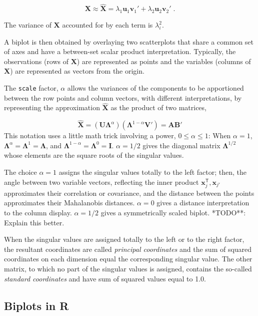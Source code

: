 \documentclass[
  letterpaper,
  10pt,
  krantz2]{krantz}
\begin{document}
{\[
\mathbf{X} \approx \widehat{\mathbf{X}} = \lambda_1 \mathbf{u}_1 \mathbf{v}_1' + \lambda_2 \mathbf{u}_2 \mathbf{v}_2' \; .
\]

The variance of \(\mathbf{X}\) accounted for by each term is
\(\lambda_i^2\).

A biplot is then obtained by overlaying two scatterplots that share a
common set of axes and have a between-set scalar product interpretation.
Typically, the observations (rows of \(\mathbf{X}\)) are represented as
points and the variables (columns of \(\mathbf{X}\)) are represented as
vectors from the origin.

The \texttt{scale} factor, \(\alpha\) allows the variances of the
components to be apportioned between the row points and column vectors,
with different interpretations, by representing the approximation
\(\widehat{\mathbf{X}}\) as the product of two matrices,

\[
\widehat{\mathbf{X}} = (\mathbf{U} \mathbf{\Lambda}^\alpha) (\mathbf{\Lambda}^{1-\alpha} \mathbf{V}') = \mathbf{A} \mathbf{B}'
\] This notation uses a little math trick involving a power,
\(0 \le \alpha \le 1\): When \(\alpha = 1\),
\(\mathbf{\Lambda}^\alpha = \mathbf{\Lambda}^1  =\mathbf{\Lambda}\), and
\(\mathbf{\Lambda}^{1-\alpha} = \mathbf{\Lambda}^0  =\mathbf{I}\).
\(\alpha = 1/2\) gives the diagonal matrix \(\mathbf{\Lambda}^{1/2}\)
whose elements are the square roots of the singular values.

The choice \(\alpha = 1\) assigns the singular values totally to the
left factor; then, the angle between two variable vectors, reflecting
the inner product \(\mathbf{x}_j^\textsf{T}, \mathbf{x}_{j'}\)
approximates their correlation or covariance, and the distance between
the points approximates their Mahalanobis distances. \(\alpha = 0\)
gives a distance interpretation to the column display. \(\alpha = 1/2\)
gives a symmetrically scaled biplot. *TODO**: Explain this better.

When the singular values are assigned totally to the left or to the
right factor, the resultant coordinates are called \emph{principal
coordinates} and the sum of squared coordinates on each dimension equal
the corresponding singular value. The other matrix, to which no part of
the singular values is assigned, contains the so-called \emph{standard
coordinates} and have sum of squared values equal to 1.0.

\subsection{Biplots in R}\label{biplots-in-r}

}
\end{document}
